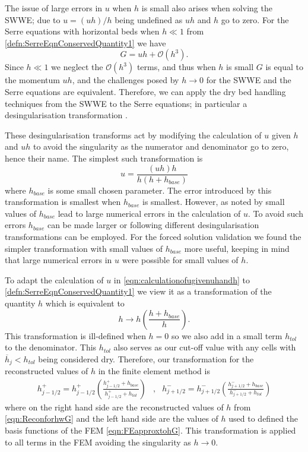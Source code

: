 \documentclass[times]{elsarticle}
\begin{document}
The issue of large errors in $u$ when $h$ is small also arises when solving the SWWE; due to $u = (uh)/h $ being undefined as $u h $ and $h$ go to zero. For the Serre equations with horizontal beds when $h \ll 1$ from \eqref{defn:SerreEqnConservedQuantity1} we have
\begin{equation}
G = uh + \mathcal{O}\left(h^3\right).
\end{equation}
Since $h \ll 1$ we neglect the $\mathcal{O}\left(h^3\right)$ terms, and thus when $h$ is small $G$ is equal to the momentum $uh$, and the challenges posed by $h \rightarrow 0$ for the SWWE and the Serre equations are equivalent. Therefore, we can apply the dry bed handling techniques from the SWWE to the Serre equations; in particular a desingularisation transformation \cite{Kurganov-Petrova-2007-707}. 

These desingularisation transforms act by modifying the calculation of $u$ given $h$ and $uh$ to avoid the singularity as the numerator and denominator go to zero, hence their name. The simplest such transformation is
\begin{equation}
u = \frac{(uh) h}{h\left(h + h_{base}\right)}
\label{eqn:calculationofugivenuhandh}
\end{equation}
where $h_{base}$ is some small chosen parameter. The error introduced by this transformation is smallest when $h_{base}$ is smallest. However, as noted by \citet{Kurganov-Petrova-2007-707} small values of $h_{base}$ lead to large numerical errors in the calculation of $u$. To avoid such errors $h_{base}$ can be made larger or following \citet{Kurganov-Petrova-2007-707} different desingularisation transformations can be employed. For the forced solution validation we found the simpler transformation with small values of $h_{base}$ more useful, keeping in mind that large numerical errors in $u$ were possible for small values of $h$. 

To adapt the calculation of $u$ in \eqref{eqn:calculationofugivenuhandh} to \eqref{defn:SerreEqnConservedQuantity1} we view it as a transformation of the quantity $h$ which is equivalent to
\begin{equation}
h \rightarrow h \left( \frac{h + h_{base}}{h} \right).
\end{equation}
This transformation is ill-defined when $h = 0$ so we also add in a  small term $h_{tol}$ to the denominator. This $h_{tol}$ also serves as our cut-off value with any cells with $\overline{h}_j < h_{tol}$ being considered dry. Therefore, our transformation for the reconstructed values of $h$ in the finite element method is
\begin{align}
\label{eqn:hdrytransform}
h^+_{j-1/2}  = h^+_{j-1/2} \left(\frac{ h^+_{j-1/2}  + h_{base}}{h^+_{j-1/2} + h_{tol}}\right) &,&
h^-_{j+1/2}  = h^-_{j+1/2} \left(\frac{ h^-_{j+1/2}  + h_{base}}{h^-_{j+1/2} + h_{tol}}\right)
\end{align} 
where on the right hand side are the reconstructed values of $h$ from \eqref{eqn:ReconforhwG} and the left hand side are the values of $h$ used to defined the basis functions of the FEM \eqref{eqn:FEapproxtohG}. This transformation is applied to all terms in the FEM avoiding the singularity as $h \rightarrow 0$.
\end{document}
